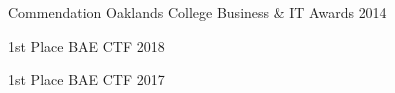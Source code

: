 



\begin{cvhonors}

  \cvhonor
    {Commendation} %
    {Oaklands College Business \& IT Awards} %
    {} %
    {2014} %

\end{cvhonors}




\begin{cvhonors}

  \cvhonor
    {1st Place} %
    {BAE CTF} %
    {} %
    {2018} %

  \cvhonor
    {1st Place} %
    {BAE CTF} %
    {} %
    {2017} %

\end{cvhonors}
